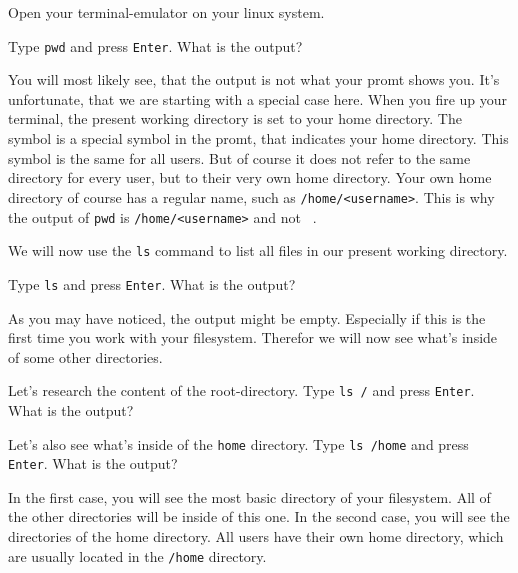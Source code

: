 \begin{challenge}
    \begin{task}
    Open your terminal-emulator on your linux system.
        \begin{questions}
            \item Type \texttt{pwd} and press \texttt{Enter}. What is the output?
        \end{questions}
    You will most likely see, that the output is not what your promt shows you. 
    It's unfortunate, that we are starting with a special case here.
    When you fire up your terminal, the present working directory is set to your home directory.
    The \texttt{~} symbol is a special symbol in the promt, that indicates your home directory.
    This symbol is the same for all users. 
    But of course it does not refer to the same directory for every user, but to their very own home directory.
    Your own home directory of course has a regular name, such as \texttt{/home/<username>}.
    This is why the output of \texttt{pwd} is \texttt{/home/<username>} and not \texttt{~}.
    \end{task}

    \begin{task}
        We will now use the \texttt{ls} command to list all files in our present working directory.
        \begin{questions}
            \item Type \texttt{ls} and press \texttt{Enter}. What is the output?
        \end{questions}
    \end{task}

    \begin{task}
        As you may have noticed, the output might be empty.
        Especially if this is the first time you work with your filesystem.
        Therefor we will now see what's inside of some other directories. 
        \begin{questions}
            \item Let's research the content of the root-directory. Type \texttt{ls /} and press \texttt{Enter}. What is the output?
            \item Let's also see what's inside of the \texttt{home} directory. Type \texttt{ls /home} and press \texttt{Enter}. What is the output?
        \end{questions}
        In the first case, you will see the most basic directory of your filesystem.
        All of the other directories will be inside of this one.
        In the second case, you will see the directories of the home directory.
        All users have their own home directory, which are usually located in the \texttt{/home} directory.
    \end{task}


\end{challenge}
